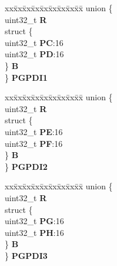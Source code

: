 \begin{DoxyCompactItemize}
\begin{tabbing}
\end{tabbing}\item 
\mbox{\label{structSIU__tag_a0e93de614823542e222b11f1aaa3f313}} 
\begin{tabbing}
xx\=xx\=xx\=xx\=xx\=xx\=xx\=xx\=xx\=\kill
union \{\\
\>uint32\_t {\bfseries R}\\
\>struct \{\\
\>\>uint32\_t {\bfseries PC}:16\\
\>\>uint32\_t {\bfseries PD}:16\\
\>\} {\bfseries B}\\
\} {\bfseries PGPDI1}\\

\end{tabbing}\item 
\mbox{\label{structSIU__tag_a3fae0441d0d77a2defcf5b15b3acaf79}} 
\begin{tabbing}
xx\=xx\=xx\=xx\=xx\=xx\=xx\=xx\=xx\=\kill
union \{\\
\>uint32\_t {\bfseries R}\\
\>struct \{\\
\>\>uint32\_t {\bfseries PE}:16\\
\>\>uint32\_t {\bfseries PF}:16\\
\>\} {\bfseries B}\\
\} {\bfseries PGPDI2}\\

\end{tabbing}\item 
\mbox{\label{structSIU__tag_a24930f4d55b14cd127aa678f9895843d}} 
\begin{tabbing}
xx\=xx\=xx\=xx\=xx\=xx\=xx\=xx\=xx\=\kill
union \{\\
\>uint32\_t {\bfseries R}\\
\>struct \{\\
\>\>uint32\_t {\bfseries PG}:16\\
\>\>uint32\_t {\bfseries PH}:16\\
\>\} {\bfseries B}\\
\} {\bfseries PGPDI3}\\


\end{tabbing}
\end{DoxyCompactItemize}
